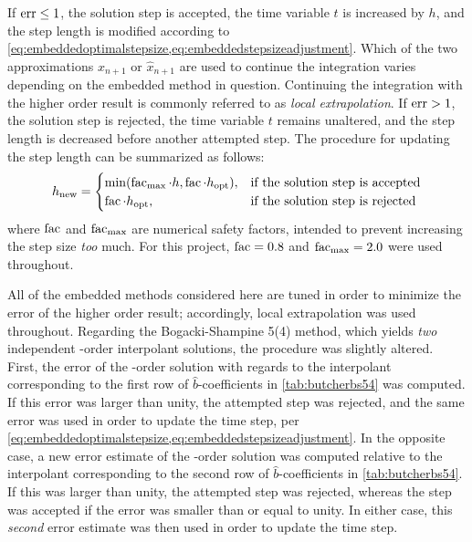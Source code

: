 If $\operatorname{err}\leq1$, the solution step is accepted, the time variable $t$ is
increased by $h$, and the step length is modified according to
\cref{eq:embeddedoptimalstepsize,eq:embeddedstepsizeadjustment}. Which of the
two approximations $x_{n+1}$ or $\widehat{x}_{n+1}$ are used to continue the
integration varies depending on the embedded method in question. Continuing the
integration with the higher order result is commonly referred to as
\emph{local extrapolation}. If $\operatorname{err}>1$, the solution step is rejected, the
time variable $t$ remains unaltered, and the step length is decreased before
another attempted step. The procedure for updating the step length can be
summarized as follows:
\begin{equation}
    \label{eq:embeddedstepsizeadjustment}
h_{\mathrm{new}}=\begin{cases}%
    \min(\facem_{\mathrm{max}}\cdot{}h,\facem\cdot{}h_{\mathrm{opt}}),&
\textnormal{if the solution step is accepted}\\
\facem\cdot{}h_{\mathrm{opt}},&\textnormal{if the solution step is rejected}%
\end{cases}
\end{equation}
where $\operatorname{fac}$ and $\operatorname{fac}_{\mathrm{max}}$ are numerical safety factors,
intended to prevent increasing the step size \emph{too} much. For this project,
$\operatorname{fac}=0.8$ and $\operatorname{fac}_{\mathrm{max}}=2.0$ were used throughout.

All of the embedded methods considered here are tuned in order to minimize
the error of the higher order result; accordingly, local extrapolation was
used throughout. Regarding the Bogacki-Shampine 5(4) method, which yields
\emph{two} independent -order interpolant solutions, the procedure was
slightly altered. First, the error of the -order solution with regards to
the interpolant corresponding to the first row of $\widehat{b}$-coefficients in
\cref{tab:butcherbs54} was computed. If this error was larger than unity,
the attempted step was rejected, and the same error was used in order to
update the time step, per
\cref{eq:embeddedoptimalstepsize,eq:embeddedstepsizeadjustment}. In the
opposite case, a new error estimate of the -order solution was computed
relative to the interpolant corresponding to the second row of
$\widehat{b}$-coefficients in \cref{tab:butcherbs54}. If this was larger than
unity, the attempted step was rejected, whereas the step was accepted if the
error was smaller than or equal to unity. In either case, this \emph{second}
error estimate was then used in order to update the time step.
